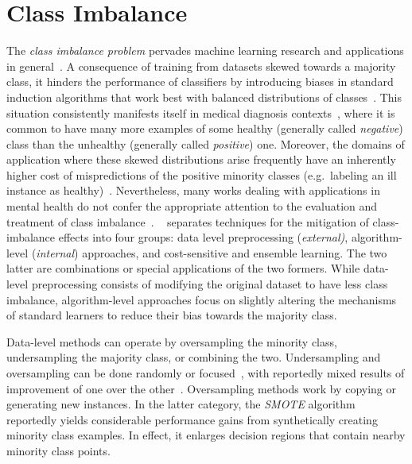 

\section{Class Imbalance} \label{sec:class_imbalance}

The \textit{class imbalance problem} pervades machine learning research and applications in general~\cite{Chawla2009}.
A consequence of training from datasets skewed towards a majority class, it hinders the performance of classifiers by introducing biases in standard induction algorithms that work best with balanced distributions of classes~\cite{Japkowicz2000}.
This situation consistently manifests itself in medical diagnosis contexts~\cite{Vluymans2019a}, where it is common to have many more examples of some healthy (generally called \textit{negative}) class than the unhealthy (generally called \textit{positive}) one.
Moreover, the domains of application where these skewed distributions arise frequently have an inherently higher cost of mispredictions of the positive minority classes (e.g.\ labeling an ill instance as healthy)~\cite{Kotsiantis2013}.
Nevertheless, many works dealing with applications in mental health do not confer the appropriate attention to the evaluation and treatment of class imbalance~\cite{Burke2019}.
~\citet{Vluymans2019a} separates techniques for the mitigation of class-imbalance effects into four groups: data level preprocessing (\textit{external)}, algorithm-level (\textit{internal}) approaches, and cost-sensitive and ensemble learning.
The two latter are combinations or special applications of the two formers.
While data-level preprocessing consists of modifying the original dataset to have less class imbalance, algorithm-level approaches focus on slightly altering the mechanisms of standard learners to reduce their bias towards the majority class.

Data-level methods can operate by oversampling the minority class, undersampling the majority class, or combining the two.
Undersampling and oversampling can be done randomly or focused~\cite{Kubat1997, Laurikkala2001}, with reportedly mixed results of improvement of one over the other~\cite{Japkowicz2002}.
Oversampling methods work by copying or generating new instances.
In the latter category, the \textit{SMOTE} algorithm~\cite{Chawla2002} reportedly yields considerable performance gains from synthetically creating minority class examples.
In effect, it enlarges decision regions that contain nearby minority class points.

